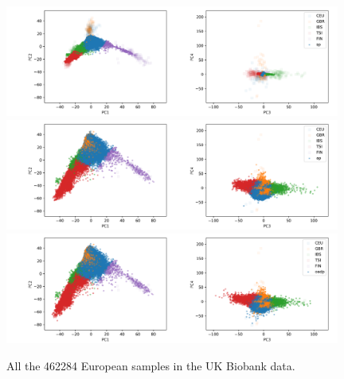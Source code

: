 \documentclass{article}
\begin{document}
\begin{figure}[p]
  \centering
  \includegraphics[width=0.98\textwidth]{img/ukb_snpscap_kgn_bial_orphans_pred_EUR_nchunks100_sturef_kgn_bial_orphans_snps_ukb_snpscap_ukb_EUR_sp.png}
  \includegraphics[width=0.98\textwidth]{img/ukb_snpscap_kgn_bial_orphans_pred_EUR_nchunks100_sturef_kgn_bial_orphans_snps_ukb_snpscap_ukb_EUR_ap.png}
  \includegraphics[width=0.98\textwidth]{img/ukb_snpscap_kgn_bial_orphans_pred_EUR_nchunks100_sturef_kgn_bial_orphans_snps_ukb_snpscap_ukb_EUR_oadp.png}
  \caption{All the 462284 European samples in the UK Biobank data.}
  \label{fig:ukb_eur}
\end{figure}
\end{document}
